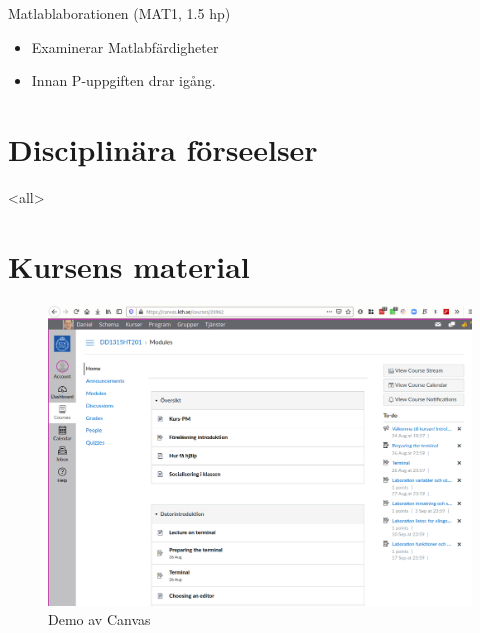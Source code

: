 \begin{frame}
  \begin{block}{Matlablaborationen (MAT1, 1.5 hp)}
    \begin{itemize}
      \item Examinerar Matlabfärdigheter
      \item Innan P-uppgiften drar igång.
    \end{itemize}
  \end{block}
\end{frame}


\section{Disciplinära förseelser}

\mode<all>{}



\section{Kursens material}

\begin{frame}
  \begin{figure}
    \includegraphics[height=0.8\textheight]{canvas.png}
    \caption{Demo av Canvas}
  \end{figure}
\end{frame}


